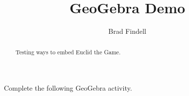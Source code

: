 \documentclass[nooutcomes]{ximera}
\title{GeoGebra Demo}
\author{Brad Findell}
\begin{document}
\begin{abstract}
Testing ways to embed Euclid the Game. 
\end{abstract}
\maketitle


\begin{problem}
Complete the following GeoGebra activity.  

\ifdefined\HCode
{}
\fi

%




\end{problem}

%
%
%
%
\end{document}

